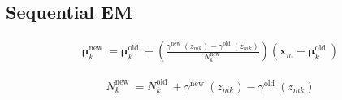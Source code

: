\documentclass{article}
\begin{document}
\subsection{Sequential EM}

\begin{align*}
\boldsymbol{\mu}_{k}^{\text{new }}=\boldsymbol{\mu}_{k}^{\text{old }}+\left(\frac{\gamma^{\text{new }}\left(z_{m k}\right)-\gamma^{\text{old }}\left(z_{m k}\right)}{N_{k}^{\text{new }}}\right)\left(\mathbf{x}_{m}-\boldsymbol{\mu}_{k}^{\text{old }}\right)
\tag{15.60}
\end{align*}

\begin{align*}
N_{k}^{\text{new }}=N_{k}^{\text{old }}+\gamma^{\text{new }}\left(z_{m k}\right)-\gamma^{\text{old }}\left(z_{m k}\right)
\tag{15.61}
\end{align*}
\end{document}
